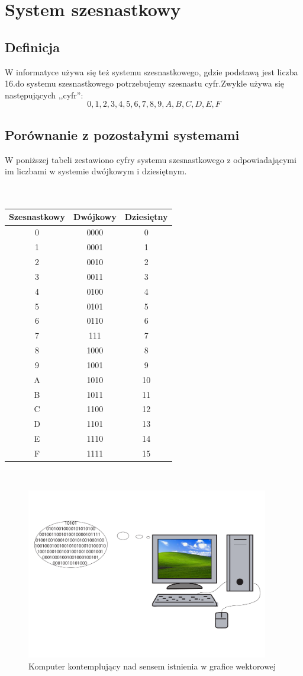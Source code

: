 \documentclass[12pt]{article}
\begin{document}
\newpage
\section{System szesnastkowy}
\subsection{Definicja}
W informatyce używa się też systemu szesnastkowego, gdzie podstawą jest liczba 16.do systemu szesnastkowego potrzebujemy szesnastu cyfr.Zwykle używa się następujących ,,cyfr'':$$0,1,2,3,4,5,6,7,8,9,A,B,C,D,E,F$$ 
\subsection{Porównanie z pozostałymi systemami}
W poniższej tabeli zestawiono cyfry systemu szesnastkowego z odpowiadającymi im liczbami w systemie dwójkowym i dziesiętnym.
\\
\\
\\

{\centering
\begin{tabular}{|c|c|c|}
\hline
Szesnastkowy&Dwójkowy&Dziesiętny\\ \hline
0&0000&0\\
1&0001&1\\
2&0010&2\\
3&0011&3\\
4&0100&4\\
5&0101&5\\
6&0110&6\\
7&111&7\\
8&1000&8\\
9&1001&9\\
A&1010&10\\
B&1011&11\\
C&1100&12\\
D&1101&13\\
E&1110&14\\
F&1111&15\\

\hline
\end{tabular}
\\}

\begin{figure}[!ht]
	\centering
		\includegraphics[scale=0.9,width=300pt]{computer.pdf}
	\caption{Komputer kontemplujący nad sensem istnienia w grafice wektorowej}
	
\end{figure}
\end{document}
